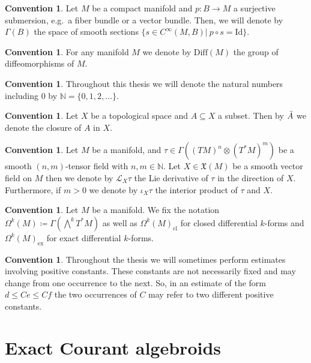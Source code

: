 \documentclass[12pt,a4paper]{article}
\theoremstyle{plain}
\theoremstyle{definition}
\newtheorem{convention}[theorem]{Convention}
\newcommand{\N}{\mathbb{N}}
\newcommand{\tens}{\otimes}
\newcommand{\VFs}{\mathfrak{X}(M)}
\newcommand{\Forms}[1]{\Omega^{#1}(M)}
\newcommand{\ClForms}[1]{\Forms{#1}_{\mathrm{cl}}}
\newcommand{\ExForms}[1]{\Forms{#1}_{\mathrm{ex}}}
\newcommand{\LieD}{\mathcal{L}}
\newcommand{\Diff}{\mathrm{Diff}(M)}
\newcommand{\Id}{\mathrm{Id}}
\begin{document}
\begin{convention}
Let $M$ be a compact manifold and $p:B\to M$ a surjective submersion, e.g.~a fiber bundle or a vector bundle. Then, we will denote by $\Gamma(B)$ the space of smooth sections $\{s\in C^\infty(M,B)|~p\circ s=\Id\}$.
\end{convention}

\begin{convention}
    For any manifold $M$ we denote by $\Diff$ the group of diffeomorphisms of $M$.
\end{convention}

\begin{convention}
Throughout this thesis we will denote the natural numbers including $0$ by $\N=\{0,1,2,\ldots \}$.
\end{convention}

\begin{convention}
Let $X$ be a topological space and $A\subseteq X$ a subset. Then by $\Bar{A}$ we denote the closure of $A$ in $X$.
\end{convention}

\begin{convention}
Let $M$ be a manifold, and $\tau\in \Gamma((TM)^n\tens (T^*M)^m)$ be a smooth $(n,m)$-tensor field with $n,m\in \N$. Let $X\in \VFs$ be a smooth vector field on $M$ then we denote by $\LieD_X\tau$ the Lie derivative of $\tau$ in the direction of $X$. Furthermore, if $m>0$ we denote by $\iota_X\tau$ the interior product of $\tau$ and $X$.
\end{convention}

\begin{convention}
    Let $M$ be a manifold. We fix the notation $\Forms{k}\coloneqq \Gamma(\bigwedge^k T^*M)$ as well as $\ClForms{k}$ for closed differential $k$-forms and $\ExForms{k}$ for exact differential $k$-forms.
\end{convention}

\begin{convention}
    Throughout the thesis we will sometimes perform estimates involving positive constants. These constants are not necessarily fixed and may change from one occurrence to the next. So, in an estimate of the form $d\leq C e\leq C f$ the two occurrences of $C$ may refer to two different positive constants.
\end{convention}







\section{Exact Courant algebroids}
\label{Section:ExactCourantAlgebroids}
\end{document}
